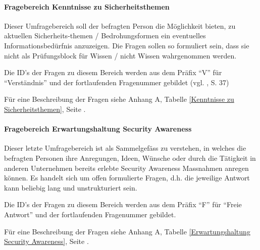 \documentclass[../../main.tex]{subfiles}
\begin{document}
\paragraph*{Fragebereich Kenntnisse zu Sicherheitsthemen}\mbox{}

\begin{sloppypar}
Dieser Umfragebereich soll der befragten Person die Möglichkeit bieten, zu aktuellen Sicherheits-themen / Bedrohungsformen ein eventuelles Informationsbedürfnis anzuzeigen. Die Fragen sollen so formuliert sein, dass sie nicht als Prüfungsblock für Wissen / nicht Wissen wahrgenommen werden.

Die ID's der Fragen zu diesem Bereich werden aus dem Präfix "`V"' für "`Verständnis"' und der fortlaufenden Fragenummer gebildet (vgl. \citeauthor{kirchhoff_fragebogen:_2010} \citeyear{kirchhoff_fragebogen:_2010}, S. 37)

Für eine Beschreibung der Fragen siehe Anhang A, Tabelle \ref{Kenntnisse zu Sicherheitsthemen}, Seite \pageref{Kenntnisse zu Sicherheitsthemen}.
\end{sloppypar}


\paragraph*{Fragebereich Erwartungshaltung Security Awareness}\mbox{}

\begin{sloppypar}
Dieser letzte Umfragebereich ist als Sammelgefäss zu verstehen, in welches die befragten Personen ihre Anregungen, Ideen, Wünsche oder durch die Tätigkeit in anderen Unternehmen bereits erlebte Security Awareness Massnahmen anregen können. Es handelt sich um offen formulierte Fragen, d.h. die jeweilige Antwort kann beliebig lang und unstrukturiert sein.

Die ID's der Fragen zu diesem Bereich werden aus dem Präfix "`F"' für "`Freie Antwort"' und der fortlaufenden Fragenummer gebildet.

Für eine Beschreibung der Fragen siehe Anhang A, Tabelle \ref{Erwartungshaltung Security Awareness}, Seite \pageref{Erwartungshaltung Security Awareness}.
\end{sloppypar}
\end{document}
